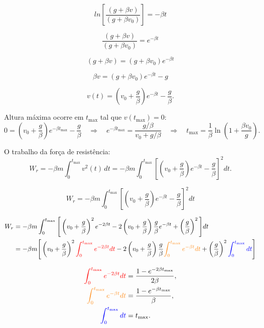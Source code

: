 \documentclass[a4paper,12pt]{article}
\begin{document}
\begin{flushleft}
\[
ln \left[\frac{\left( g+ \beta v \right)}{ \left( g+ \beta v_0 \right)}\right] = - \beta t
\]

\[
\frac{\left( g+ \beta v \right)}{ \left( g+ \beta v_0 \right)} = e^{- \beta t}
\]

\[
\left( g+ \beta v \right)= \left( g+ \beta v_0 \right) e^{- \beta t}
\]

\[
\beta v = \left( g+ \beta v_0 \right) e^{- \beta t} - g
\]

\[
\boxed{
v(t) = \left(v_0 + \frac{g}{\beta}\right) e^{-\beta t} - \frac{g}{\beta}.
}
\]

\colorbox{green!30}{Altura máxima ocorre em $t_\text{max}$ tal que $v(t_\text{max}) = 0$}:
\[
0 = \left(v_0 + \frac{g}{\beta}\right) e^{-\beta t_\text{max}} - \frac{g}{\beta} 
\quad \Rightarrow \quad 
e^{-\beta t_\text{max}} = \frac{g/\beta}{v_0 + g/\beta} 
\quad \Rightarrow \quad \boxed{t_\text{max} = \frac{1}{\beta} \ln \left( 1 + \frac{\beta v_0}{g} \right).}
\]

O trabalho da força de resistência:
\[
W_r = - \beta m \int_0^{t_\text{max}} v^2(t) \, dt
= - \beta m \int_0^{t_\text{max}} \left[ \left(v_0 + \frac{g}{\beta}\right) e^{-\beta t} - \frac{g}{\beta} \right]^2 dt.
\]

\[
W_r = - \beta m \int_0^{t_\text{max}} \left[ \left(v_0 + \frac{g}{\beta}\right) e^{-\beta t} - \frac{g}{\beta} \right]^2 dt
\]

\[
\begin{aligned}
W_r &= - \beta m \int_0^{t_\text{max}} \Bigg[ 
\left(v_0 + \frac{g}{\beta}\right)^2 e^{-2\beta t} 
- 2 \left(v_0 + \frac{g}{\beta}\right) \frac{g}{\beta} e^{-\beta t} 
+ \left(\frac{g}{\beta}\right)^2 
\Bigg] dt \\
&= - \beta m \Bigg[ 
\left(v_0 + \frac{g}{\beta}\right)^2 \textcolor{red}{\int_0^{t_\text{max}} e^{-2\beta t} dt} 
- 2 \left(v_0 + \frac{g}{\beta}\right) \frac{g}{\beta} \textcolor{orange!90}{\int_0^{t_\text{max}} e^{-\beta t} dt }
+ \left(\frac{g}{\beta}\right)^2 \textcolor{blue}{\int_0^{t_\text{max}} dt}
\Bigg]
\end{aligned}
\]

\[
\begin{aligned}
\textcolor{red}{\int_0^{t_\text{max}} e^{-2\beta t} dt} &= \frac{1 - e^{-2 \beta t_\text{max}}}{2\beta}, \\
\textcolor{orange!90}{\int_0^{t_\text{max}} e^{-\beta t} dt } &= \frac{1 - e^{-\beta t_\text{max}}}{\beta}, \\
\textcolor{blue}{\int_0^{t_\text{max}} dt} & = t_\text{max}.
\end{aligned}
\]


\end{flushleft}
\end{document}
